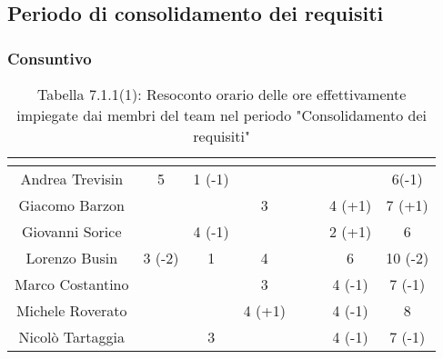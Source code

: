 \subsection{Periodo di consolidamento dei requisiti}
\subsubsection{Consuntivo}
\renewcommand{\arraystretch}{1.5}
\begin{table}[H]
\begin{center}
\begin{tabular}{|c|c|c|c|c|c|c|c|}
\hline
\rowcolor{title_row}
\textbf{\color{title_text}{Nome}} & \textbf{\color{title_text}{Resp.}} & \textbf{\color{title_text}{Ammi.}} & \textbf{\color{title_text}{Analist.}} & \textbf{\color{title_text}{Progett.}} & \textbf{\color{title_text}{Program.}} & \textbf{\color{title_text}{Verific.}} & \textbf{\color{title_text}{Totale}} \\ \hline
Andrea Trevisin  & 5 & 1 (-1) & & & & & 6(-1) \\ \hline
Giacomo Barzon   & & & 3 & & & 4 (+1) & 7 (+1) \\ \hline
Giovanni Sorice  & & 4 (-1) & & & & 2 (+1) & 6  \\ \hline
Lorenzo Busin    & 3 (-2) & 1 & 4 & & & 6 & 10 (-2) \\ \hline
Marco Costantino & & & 3 & & & 4 (-1) & 7 (-1) \\ \hline
Michele Roverato & & & 4 (+1) & & & 4 (-1) & 8 \\ \hline
Nicolò Tartaggia & & 3 & & & & 4 (-1) & 7 (-1)  \\ \hline
\end{tabular}
\caption{Tabella 7.1.1(1): Resoconto orario delle ore effettivamente impiegate dai membri del team nel periodo "Consolidamento dei requisiti"\label{}}
\end{center}
\end{table}
\renewcommand{\arraystretch}{1}

